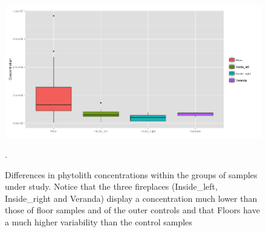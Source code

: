 \documentclass[authoryear,preprint,review,12pt]{elsarticle}
\begin{document}
\begin{figure}[ht!]
  \begin{center}
    \includegraphics[width=15cm]{figures/concentration_groups}
    \caption{Differences in phytolith concentrations within the groups of samples under study. Notice that the three fireplaces (Inside\_left, Inside\_right and Veranda) display a concentration much lower than those of floor samples and of the outer controls and that Floors have a much higher variability than the control samples}.
    \label{fig:conc}
  \end{center}
\end{figure}
\end{document}
